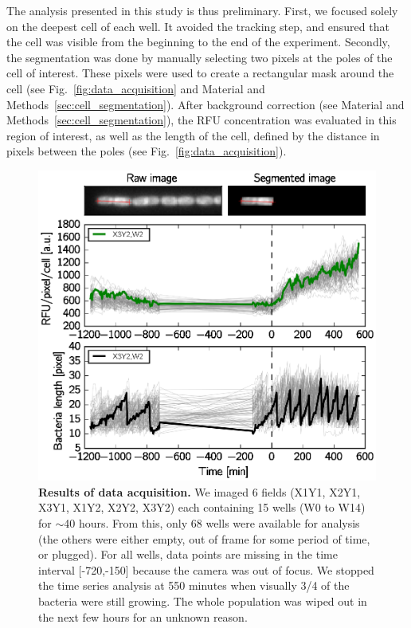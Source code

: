 The analysis presented in this study is thus preliminary.
First, we focused solely on the deepest cell of each well.
It avoided the tracking step, and ensured that the cell was visible from the beginning to the end of the experiment.
Secondly, the segmentation was done by manually selecting two pixels at the poles of the cell of interest.
These pixels were used to create a rectangular mask around the cell (see Fig.~\ref{fig:data_acquisition} and Material and Methods~\ref{sec:cell_segmentation}).
After background correction (see Material and Methods~\ref{sec:cell_segmentation}), the RFU concentration was evaluated in this region of interest, as well as the length of the cell, defined by the distance in pixels between the poles (see Fig.~\ref{fig:data_acquisition}).

\begin{figure}[p]
\centering
\includegraphics[scale=1]{./Fig/data_acquisition}
\caption{
\textbf{Results of data acquisition.}
We imaged 6 fields (X1Y1, X2Y1, X3Y1, X1Y2, X2Y2, X3Y2) each containing 15 wells (W0 to W14) for $\sim$40 hours.
From this, only 68 wells were available for analysis (the others were either empty, out of frame for some period of time, or plugged).
For all wells, data points are missing in the time interval [-720,-150] because the camera was out of focus.
We stopped the time series analysis at 550 minutes when visually 3/4 of the bacteria were still growing.
The whole population was wiped out in the next few hours for an unknown reason.
}
\end{figure}

